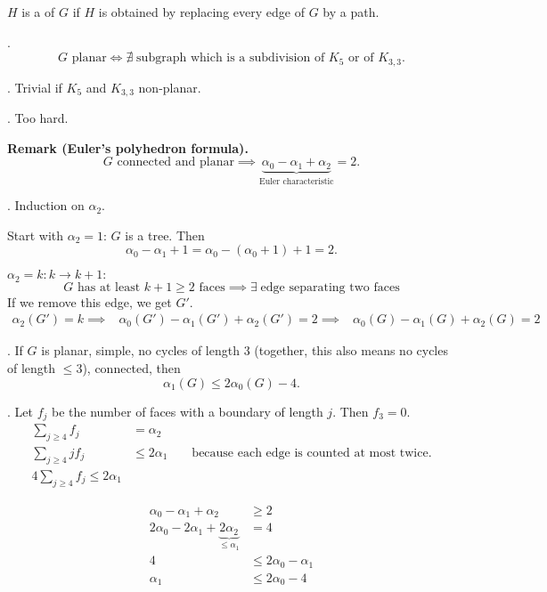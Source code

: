 \begin{definition}
$H$ is a  of $G$ if $H$ is obtained by replacing every edge of $G$ by a path.
\end{definition}

\Theorem.
\[
    G\text{ planar} \iff \nexists\;\text{subgraph which is a subdivision of $K_5$ or of $K_{3,3}$.}
\]

\ProofBackward. Trivial if $K_5$ and $K_{3,3}$ non-planar.

\ProofForward. Too hard.

\textbf{Remark (Euler's polyhedron formula).}
\[
    G\text{ connected and planar} \implies
    \underbrace{\alpha_0 - \alpha_1 + \alpha_2}_
        {\text{Euler characteristic}}
    = 2.
\]


\Proof.
Induction on $\alpha_2$.

Start with $\alpha_2=1$: $G$ is a tree. Then
\[
    \alpha_0-\alpha_1+1 = \alpha_0 - (\alpha_0 + 1) + 1 = 2.
\]

$\alpha_2 = k : k\rightarrow k+1: $
\[
    \text{$G$ has at least $k+1 \geq 2$ faces} \implies
    \exists\;\text{edge separating two faces}
\]
If we remove this edge, we get $G'$.
\begin{align*}
    \alpha_2(G') = k
    \implies &\alpha_0(G') - \alpha_1(G') + \alpha_2(G') = 2
    \implies &\alpha_0(G) - \alpha_1(G) + \alpha_2(G) = 2
\end{align*}

\Lemma.
If $G$ is planar, simple, no cycles of length $3$ (together, this also means no cycles of length $≤ 3$), connected, then
\[
    \alpha_1(G) ≤ 2\alpha_0(G) - 4.
\]

\Proof. 
Let $f_j$ be the number of faces with a boundary of length $j$.
Then $f_3 = 0$.
\begin{align*}
\sum_{j≥4} f_j &= \alpha_2 \\
\sum_{j≥4} j f_j &≤ 2\alpha_1
    &&\text{ because each edge is counted at most twice.} \\
4 \sum_{j≥4} f_j ≤ 2\alpha_1
\end{align*}


\begin{align*}
    \alpha_0 - \alpha_1 + \alpha_2 &≥ 2 \\
    2\alpha_0 - 2\alpha_1 +
    \underbrace{2\alpha_2}_{≤ \alpha_1} &= 4 \\
    4 &≤ 2\alpha_0 - \alpha_1 \\
    \alpha_1 &≤ 2\alpha_0 - 4
\end{align*}

